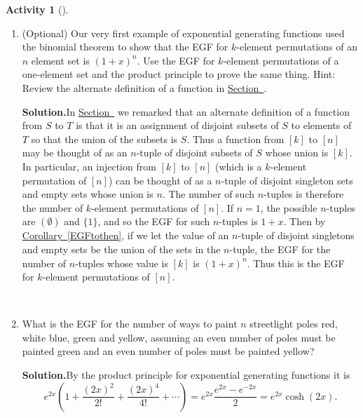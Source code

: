 \documentclass[10pt,]{book}
\theoremstyle{plain}
\theoremstyle{definition}
\newtheorem{activity}[project]{Activity}
\numberwithin{equation}{chapter}
\begin{document}
\begin{activity}[]\label{activity-378}
~\par
\begin{enumerate}[label=(\alph*)]
 \item (Optional) Our very first example of exponential generating functions used the binomial theorem to show that the EGF for \(k\)-element permutations of an \(n\) element set is \((1+x)^n\). Use the EGF for \(k\)-element permutations of a one-element set and the product principle to prove the same thing. Hint: Review the alternate definition of a function in \hyperref[orderedfunctionsection]{Section~}.%
\par\medskip\noindent%
\textbf{Solution.}\quad In \hyperref[orderedfunctionsection]{Section~} we remarked that an alternate definition of a function from \(S\) to \(T\) is that it is an assignment of disjoint subsets of \(S\) to elements of \(T\) so that the union of the subsets is \(S\). Thus a function from \([k]\) to \([n]\) may be thought of as an \(n\)-tuple of disjoint subsets of \(S\) whose union is \([k]\). In particular, an injection from \([k]\) to \([n]\) (which is a \(k\)-element permutation of \([n]\)) can be thought of as a \(n\)-tuple of disjoint singleton sets and empty sets whose union is \(n\). The number of such \(n\)-tuples is therefore the number of \(k\)-element permutations of \([n]\). If \(n=1\), the possible \(n\)-tuples are \((\emptyset)\) and \(\{1\}\), and so the EGF for such \(n\)-tuples is \(1+x\). Then by \hyperref[EGFtothen]{Corollary~\ref{EGFtothen}}, if we let the value of an \(n\)-tuple of disjoint singletons and empty sets be the union of the sets in the \(n\)-tuple, the EGF for the number of \(n\)-tuples whose value is \([k]\) is \((1+x)^n\). Thus this is the EGF for \(k\)-element permutations of \([n]\).%

~\par
\item What is the EGF for the number of ways to paint \(n\) streetlight poles red, white blue, green and yellow, assuming an even number of poles must be painted green and an even number of poles must be painted yellow?%
\par\medskip\noindent%
\textbf{Solution.}\quad By the product principle for exponential generating functions it is%
\begin{equation*}
e^{2x}\left(1+\frac{(2x)^2}{2!}+ \frac{(2x)^4}{4!} + \cdots \right) =
e^{2x}\frac{e^{2x}-e^{-2x}}{2}=e^{2x}\cosh(2x).
\end{equation*}
%

\end{enumerate}
\end{activity}
\end{document}

